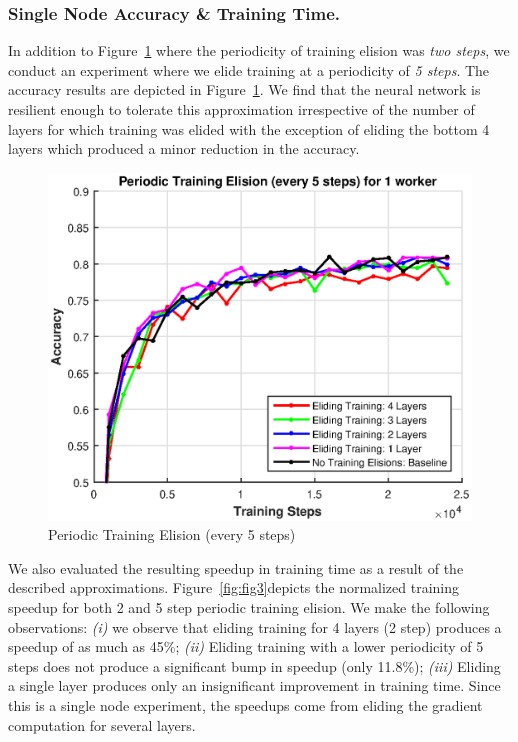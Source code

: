 \subsubsection{Single Node Accuracy \& Training Time.}
In addition to Figure~\ref{fig:fig2} where the periodicity of training elision was \emph{two steps}, we conduct an experiment where we elide training at a periodicity of \emph{5 steps}. The accuracy results are depicted in Figure~\ref{fig:fig2}. We find that the neural network is resilient enough to tolerate this approximation irrespective of the number of layers for which training was elided with the exception of eliding the bottom 4 layers which produced a minor reduction in the accuracy. 
\begin{figure}[t]
	\centering
	\includegraphics[width=0.8\columnwidth]{figures/fig2.eps}
	\caption{Periodic Training Elision (every 5 steps)}
	\label{fig:fig2}
\end{figure}
We also evaluated the resulting speedup in training time as a result of the described approximations. Figure~\ref{fig:fig3}depicts the normalized training speedup for both 2 and 5 step periodic training elision. We make the following observations: \emph{(i)} we observe that eliding training for 4 layers (2 step) produces a speedup of as much as 45\%; \emph{(ii)} Eliding training with a lower periodicity of 5 steps does not produce a significant bump in speedup (only 11.8\%); \emph{(iii)} Eliding a single layer produces only an insignificant improvement in training time. Since this is a single node experiment, the speedups come from eliding the gradient computation for several layers.  

